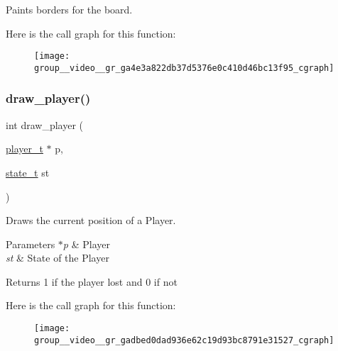 Paints borders for the board. 

Here is the call graph for this function\+:
\nopagebreak
\begin{figure}[H]
\begin{center}
\leavevmode
\texttt{[image: group\_\_video\_\_gr\_ga4e3a822db37d5376e0c410d46bc13f95\_cgraph]}
\end{center}
\end{figure}
\hypertarget{group__video__gr_gadbed0dad936e62c19d93bc8791e31527}{}\label{group__video__gr_gadbed0dad936e62c19d93bc8791e31527} 
\subsubsection{\texorpdfstring{draw\+\_\+player()}{draw\_player()}}
{\footnotesize\ttfamily int draw\+\_\+player (\begin{DoxyParamCaption}\item[{\hyperlink{structplayer__t}{player\+\_\+t} $\ast$}]{p,  }\item[{\hyperlink{group___game_gaa0aafed44fec19806d8f9ad834be1248}{state\+\_\+t}}]{st }\end{DoxyParamCaption})}



Draws the current position of a Player. 


\begin{DoxyParams}{Parameters}
{\em $\ast$p} & Player \\
\hline
{\em st} & State of the Player \\
\hline
\end{DoxyParams}
\begin{DoxyReturn}{Returns}
1 if the player lost and 0 if not 
\end{DoxyReturn}
Here is the call graph for this function\+:
\nopagebreak
\begin{figure}[H]
\begin{center}
\leavevmode
\texttt{[image: group\_\_video\_\_gr\_gadbed0dad936e62c19d93bc8791e31527\_cgraph]}
\end{center}
\end{figure}
\hypertarget{group__video__gr_gab42788264b43ce014d787544fc12fdc6}{}\label{group__video__gr_gab42788264b43ce014d787544fc12fdc6} 
